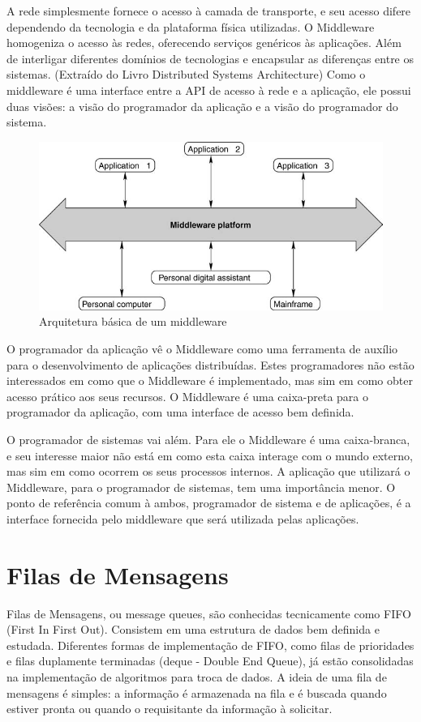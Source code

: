 \documentclass[12pt]{article}
\begin{document}
	A rede simplesmente fornece o acesso à camada de transporte, e seu acesso difere dependendo da tecnologia e da plataforma física utilizadas. O Middleware homogeniza o acesso às redes, oferecendo serviços genéricos às aplicações. Além de interligar diferentes domínios de tecnologias e encapsular as diferenças entre os sistemas. (Extraído do Livro Distributed Systems Architecture) Como o middleware é uma interface entre a API de acesso à rede e a aplicação, ele possui duas visões: a visão do programador da aplicação e a visão do programador do sistema.

\begin{figure}[ht]
\centering
\includegraphics[width=.5\textwidth]{Img_Middleware_Arc.png}
\caption{Arquitetura básica de um middleware}
\label{fig:fig_middleware}
\end{figure}

	O programador da aplicação vê o Middleware como uma ferramenta de auxílio para o desenvolvimento de aplicações distribuídas. Estes programadores não estão interessados em como que o Middleware é implementado, mas sim em como obter acesso prático aos seus recursos. O Middleware é uma caixa-preta para o programador da aplicação, com uma interface de acesso bem definida.

	O programador de sistemas vai além. Para ele o Middleware é uma caixa-branca, e seu interesse maior não está em como esta caixa interage com o mundo externo, mas sim em como ocorrem os seus processos internos. A aplicação que utilizará o Middleware, para o programador de sistemas, tem uma importância menor. O ponto de referência comum à ambos, programador de sistema e de aplicações, é a interface fornecida pelo middleware que será utilizada pelas aplicações.

\section{Filas de Mensagens}
	Filas de Mensagens, ou message queues, são conhecidas tecnicamente como FIFO (First In First Out). Consistem em uma estrutura de dados bem definida e estudada. Diferentes formas de implementação de FIFO, como filas de prioridades e filas duplamente terminadas (deque - Double End Queue), já estão consolidadas na implementação de algoritmos para troca de dados. A ideia de uma fila de mensagens é simples: a informação é armazenada na fila e é buscada quando estiver pronta ou quando o requisitante da informação à solicitar.
\end{document}
